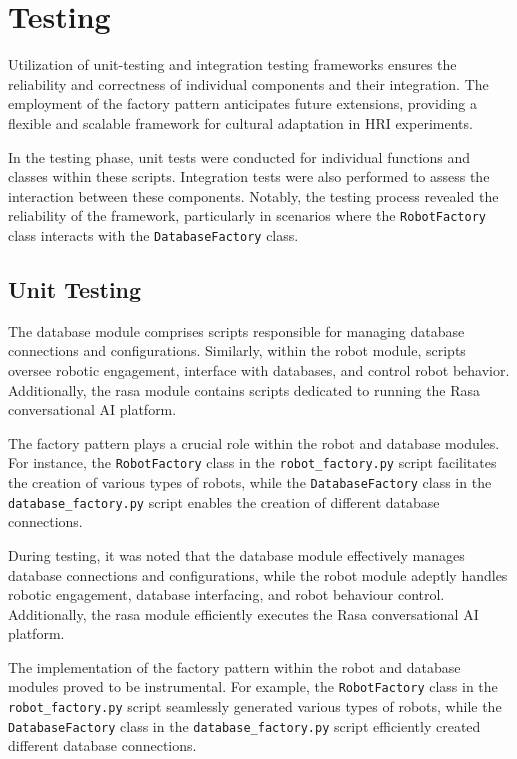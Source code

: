 \section{Testing}

Utilization of unit-testing and integration testing frameworks ensures the reliability and correctness of individual components and their integration. The employment of the factory pattern anticipates future extensions, providing a flexible and scalable framework for cultural adaptation in HRI experiments.

In the testing phase, unit tests were conducted for individual functions and classes within these scripts. Integration tests were also performed to assess the interaction between these components. Notably, the testing process revealed the reliability of the framework, particularly in scenarios where the \texttt{RobotFactory} class interacts with the \texttt{DatabaseFactory} class.

\subsection{Unit Testing}

The database module comprises scripts responsible for managing database connections and configurations. Similarly, within the robot module, scripts oversee robotic engagement, interface with databases, and control robot behavior. Additionally, the rasa module contains scripts dedicated to running the Rasa conversational AI platform.

The factory pattern plays a crucial role within the robot and database modules. For instance, the \texttt{RobotFactory} class in the \texttt{robot\_factory.py} script facilitates the creation of various types of robots, while the \texttt{DatabaseFactory} class in the \texttt{database\_factory.py} script enables the creation of different database connections.

During testing, it was noted that the database module effectively manages database connections and configurations, while the robot module adeptly handles robotic engagement, database interfacing, and robot behaviour control. Additionally, the rasa module efficiently executes the Rasa conversational AI platform.

The implementation of the factory pattern within the robot and database modules proved to be instrumental. For example, the \texttt{RobotFactory} class in the \texttt{robot\_factory.py} script seamlessly generated various types of robots, while the \texttt{DatabaseFactory} class in the \texttt{database\_factory.py} script efficiently created different database connections.

